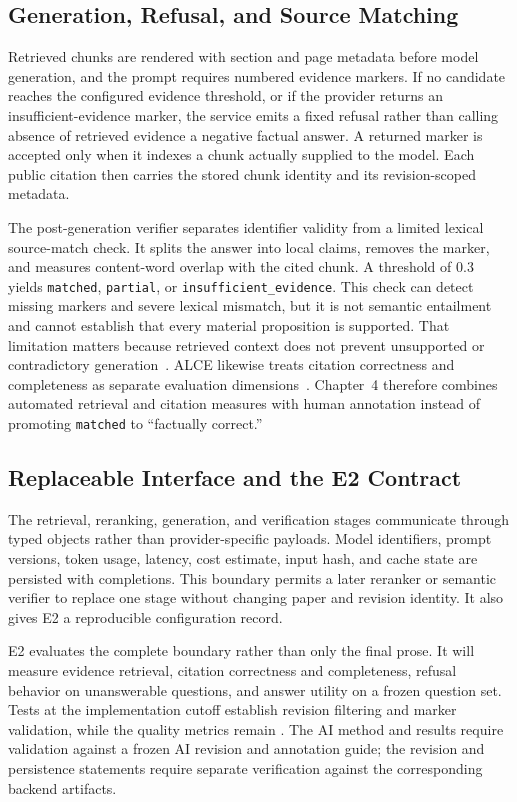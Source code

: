 \subsection{Generation, Refusal, and Source Matching}

Retrieved chunks are rendered with section and page metadata before model generation, and the prompt requires numbered evidence markers. If no candidate reaches the configured evidence threshold, or if the provider returns an insufficient-evidence marker, the service emits a fixed refusal rather than calling absence of retrieved evidence a negative factual answer. A returned marker is accepted only when it indexes a chunk actually supplied to the model. Each public citation then carries the stored chunk identity and its revision-scoped metadata.

The post-generation verifier separates identifier validity from a limited lexical source-match check. It splits the answer into local claims, removes the marker, and measures content-word overlap with the cited chunk. A threshold of 0.3 yields \texttt{matched}, \texttt{partial}, or \texttt{insufficient\_evidence}. This check can detect missing markers and severe lexical mismatch, but it is not semantic entailment and cannot establish that every material proposition is supported. That limitation matters because retrieved context does not prevent unsupported or contradictory generation~\cite{niu2024ragtruth}. ALCE likewise treats citation correctness and completeness as separate evaluation dimensions~\cite{gao2023alce}. Chapter~4 therefore combines automated retrieval and citation measures with human annotation instead of promoting \texttt{matched} to ``factually correct.''

\subsection{Replaceable Interface and the E2 Contract}

The retrieval, reranking, generation, and verification stages communicate through typed objects rather than provider-specific payloads. Model identifiers, prompt versions, token usage, latency, cost estimate, input hash, and cache state are persisted with completions. This boundary permits a later reranker or semantic verifier to replace one stage without changing paper and revision identity. It also gives E2 a reproducible configuration record.

E2 evaluates the complete boundary rather than only the final prose. It will measure evidence retrieval, citation correctness and completeness, refusal behavior on unanswerable questions, and answer utility on a frozen question set. Tests at the implementation cutoff establish revision filtering and marker validation, while the quality metrics remain \pending{}. The AI method and results require validation against a frozen AI revision and annotation guide; the revision and persistence statements require separate verification against the corresponding backend artifacts.

